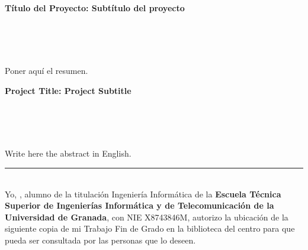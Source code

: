 


\cleardoublepage
\thispagestyle{empty}

\begin{center}
{\large\bfseries Título del Proyecto: Subtítulo del proyecto}\\
\end{center}
\begin{center}
\autor{}\\
\end{center}

\\

\vspace{0.7cm}
\\

Poner aquí el resumen.
\cleardoublepage


\thispagestyle{empty}


\begin{center}
{\large\bfseries Project Title: Project Subtitle}\\
\end{center}
\begin{center}
\autor{}\\
\end{center}

\\

\vspace{0.7cm}
\\

Write here the abstract in English.

\cleardoublepage
\thispagestyle{empty}

\noindent\rule[-1ex]{\textwidth}{2pt}\\[4.5ex]

Yo, \textbf{\autor{}}, alumno de la titulación Ingeniería Informática de la \textbf{Escuela Técnica Superior
de Ingenierías Informática y de Telecomunicación de la Universidad de Granada}, con NIE X8743846M, autorizo la
ubicación de la siguiente copia de mi Trabajo Fin de Grado en la biblioteca del centro para que pueda ser
consultada por las personas que lo deseen.

